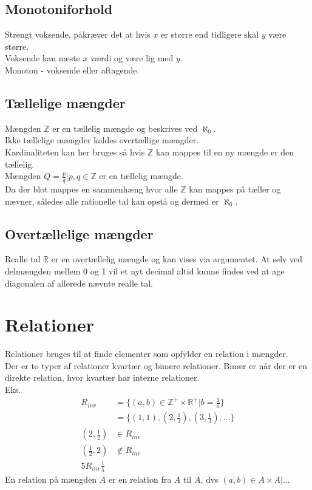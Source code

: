 \documentclass[12pt, a4paper]{article}
\begin{document}
				\subsection{Monotoniforhold}
					Strengt voksende, påkræver det at hvis $x$ er større end tidligere skal $y$ være større.\\
					Voksende kan næste $x$ værdi og være lig med $y$.\\
					Monoton - voksende eller aftagende.
				\subsection{Tællelige mængder}
					Mængden $\mathbb{Z}$ er en tællelig mængde og beskrives ved $\aleph_0$.\\
					Ikke tællelige mængder kaldes overtællige mængder.\\
					Kardinaliteten kan her bruges så hvis $\mathbb{Z}$ kan mappes til en ny mængde er den tællelig.\\
					Mængden $Q = {\frac{p}{q}|p,q\in \mathbb{Z}}$ er en tællelig mængde.\\
					Da der blot mappes en sammenhæng hvor alle $\mathbb{Z}$ kan mappes på tæller og nævner, således alle rationelle tal kan opstå og dermed er $\aleph_0$.
				\subsection{Overtællelige mængder}
					Realle tal $\mathbb{R}$ er en overtællelig mængde og kan vises via argumentet. At selv ved delmængden mellem 0 og 1 vil et nyt decimal altid kunne findes ved at age diagonalen af allerede nævnte realle tal.
			\section{Relationer}
				Relationer bruges til at finde elementer som opfylder en relation i mængder.\\
				Der er to typer af relationer kvartær og binære relationer. Binær er når der er en direkte relation, hvor kvartær har interne relationer.\\
				Eks. 
				\begin{align*}
					R_{inv}&=\{(a,b)\in \mathbb{Z}^+\times\mathbb{R}^+|b=\frac{1}{a}\}\\
					&=\{(1,1),(2,\frac{1}{2}),(3,\frac{1}{3}),...\}\\
					(2,\frac{1}{2})&\in R_{inv}\\
					(\frac{1}{2},2)&\notin R_{inv}\\
					5R_{inv}\frac{1}{5}
				\end{align*}
				En relation på mængden $A$  er en relation fra $A$ til $A$, dvs $(a,b)\in A\times A|...$
\end{document}
